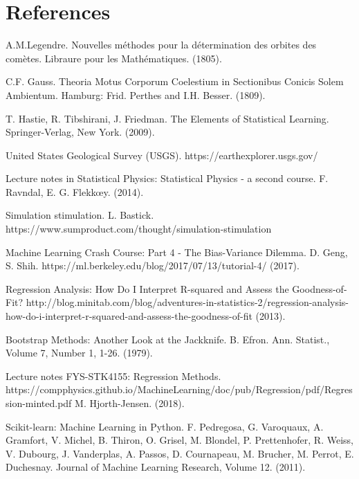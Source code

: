 \newpage
\section{References}

\begingroup
\renewcommand{\section}[2]{}
\begin{thebibliography}{}
	A.M.Legendre. 
	Nouvelles méthodes pour la détermination des orbites des comètes.
	Libraure pour les Mathématiques.
	(1805).
	
	C.F. Gauss. 
	Theoria Motus Corporum Coelestium in Sectionibus Conicis Solem Ambientum. 
	Hamburg: Frid. Perthes and I.H. Besser.
	(1809).
	
	T. Hastie, R. Tibshirani, J. Friedman.
	The Elements of Statistical Learning.
	Springer-Verlag, New York.
	(2009).
	
	United States Geological Survey (USGS).
	https://earthexplorer.usgs.gov/
	
	Lecture notes in Statistical Physics: Statistical Physics - a second course.
	F. Ravndal, E. G. Flekk\oe y.
	(2014).
	
	Simulation stimulation.
	L. Bastick.
	https://www.sumproduct.com/thought/simulation-stimulation
	
	Machine Learning Crash Course: Part 4 - The Bias-Variance Dilemma.
	D. Geng, S. Shih.
	https://ml.berkeley.edu/blog/2017/07/13/tutorial-4/
	(2017).
	
	Regression Analysis: How Do I Interpret R-squared and Assess the Goodness-of-Fit?
	http://blog.minitab.com/blog/adventures-in-statistics-2/regression-analysis-how-do-i-interpret-r-squared-and-assess-the-goodness-of-fit
	(2013).
	
	Bootstrap Methods: Another Look at the Jackknife.
	B. Efron. 
	Ann. Statist., Volume 7, Number 1, 1-26.
	(1979).
	
	Lecture notes FYS-STK4155: Regression Methods.
	https://compphysics.github.io/MachineLearning/doc/pub/Regression/pdf/Regression-minted.pdf
	M. Hjorth-Jensen.
	(2018).
	
	Scikit-learn: Machine Learning in Python.
	F. Pedregosa, G. Varoquaux, A. Gramfort, V. Michel, B. Thiron, O. Grisel, M. Blondel, P. Prettenhofer, R. Weiss, V. Dubourg, J. Vanderplas, A. Passos, D. Cournapeau, M. Brucher, M. Perrot, E. Duchesnay.
    Journal of Machine Learning Research, Volume 12.
	(2011).
	
\end{thebibliography}
\endgroup